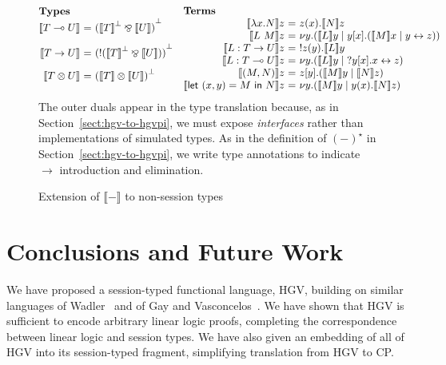 \documentclass{easychair}
\makeatletter
\newcommand{\ba}{\begin{array}}
\newcommand{\ea}{\end{array}}
\newenvironment{eqs}{\ba{@{}r@{~}c@{~}l@{}}}{\ea}
\newcommand{\key}{\mathsf}
\newcommand{\lolli}{\multimap}
\newcommand{\gvLinFun}[2]{{#1} \lolli {#2}}
\newcommand{\gvUnFun}[2]{{#1} \to {#2}}
\newcommand{\gvTimes}[2]{{#1} \otimes {#2}}
\newcommand{\gvLam}[2]{\lambda {#1}.{#2}}
\newcommand{\gvApp}[2]{{#1}~{#2}}
\newcommand{\gvPair}[2]{({#1},{#2})}
\newcommand{\gvLet}[3]{\key{let}~{#1}={#2}~\key{in}~{#3}}
\newcommand{\cpLink}[2]{{#1} \leftrightarrow {#2}}
\newcommand{\cpCut}[3]{\nu {#1}.({#2} \mid {#3})}
\newcommand{\cpOutput}[4]{{#1}[{#2}].({#3} \mid {#4})}
\newcommand{\cpInput}[3]{{#1}({#2}).{#3}}
\newcommand{\cpServe}[3]{!{#1}({#2}).{#3}}
\newcommand{\cpRequest}[3]{?{#1}[{#2}].{#3}}
\newcommand{\cpTimes}[2]{{#1} \otimes {#2}}
\newcommand{\cpPar}[2]{{#1} \mathbin{\bindnasrepma} {#2}}
\newcommand{\cpOfCourse}[1]{\mathord{!}{#1}}
\newcommand{\cpDual}[1]{{#1}^\bot}
\newcommand{\hgv}{HGV\xspace}
\newcommand{\lampi}[1]{({#1})^\star}
\newcommand{\hgvcp}[1]{\llbracket{#1}\rrbracket}
\makeatother
\begin{document}
\begin{figure}
\[
\ba{@{}cc@{}}
\begin{eqs}
\multicolumn{3}{@{}l@{}}{\textbf{Types}} \\
\hgvcp{\gvLinFun{T}{U}} &=& \cpDual{(\cpPar{\cpDual{\hgvcp{T}}}{\hgvcp{U}})} \\[2ex]
\hgvcp{\gvUnFun{T}{U}} &=& \cpDual{(\cpOfCourse{(\cpPar{\cpDual{\hgvcp{T}}}{\hgvcp{U}})})} \\[2ex]
\hgvcp{\gvTimes{T}{U}} &=& \cpDual{(\cpTimes{\hgvcp{T}}{\hgvcp{U}})} \\[2ex]
\end{eqs}%
&
\begin{eqs}
\multicolumn{3}{@{}l@{}}{\textbf{Terms}} \\
\hgvcp{\gvLam{x}{N}}z &=& \cpInput{z}{x}{\hgvcp{N}z} \\
\hgvcp{\gvApp{L}{M}}z &=& \cpCut{y}{\hgvcp{L}y}{\cpOutput{y}{x}{\hgvcp{M}x}{\cpLink{y}{z}}} \\
\hgvcp{L : \gvUnFun{T}{U}}z &=& \cpServe{z}{y}{\hgvcp{L}y} \\
\hgvcp{L : \gvLinFun{T}{U}}z &=& \cpCut{y}{\hgvcp{L}y}{\cpRequest{y}{x}{\cpLink{x}{z}}} \\
\hgvcp{\gvPair{M}{N}}z &=& \cpOutput{z}{y}{\hgvcp{M}y}{\hgvcp{N}z} \\
\hgvcp{\gvLet{\gvPair{x}{y}}{M}{N}}z
  &=& \cpCut{y}{\hgvcp{M}y}{\cpInput{y}{x}{\hgvcp{N}z}} \\
\end{eqs}%
\ea
\]
\footnotesize {The outer duals appear in the type translation because, as in
  Section~\ref{sect:hgv-to-hgvpi}, we must expose \emph{interfaces} rather than implementations of
  simulated types. As in the definition of $\lampi{-}$ in Section~\ref{sect:hgv-to-hgvpi}, we write
  type annotations to indicate $\to$ introduction and elimination.}

\caption{Extension of $\hgvcp{-}$ to non-session types}
\label{fig:hgvcp-ext}
\end{figure}


\section{Conclusions and Future Work}
\label{sect:conclusion}

We have proposed a session-typed functional language, \hgv, building on similar languages of
Wadler~\cite{Wadler12} and of Gay and Vasconcelos~\cite{GayVasconcelos10}. We have shown that \hgv
is sufficient to encode arbitrary linear logic proofs, completing the correspondence between linear
logic and session types. We have also given an embedding of all of \hgv into its session-typed
fragment, simplifying translation from \hgv to CP.
\end{document}
